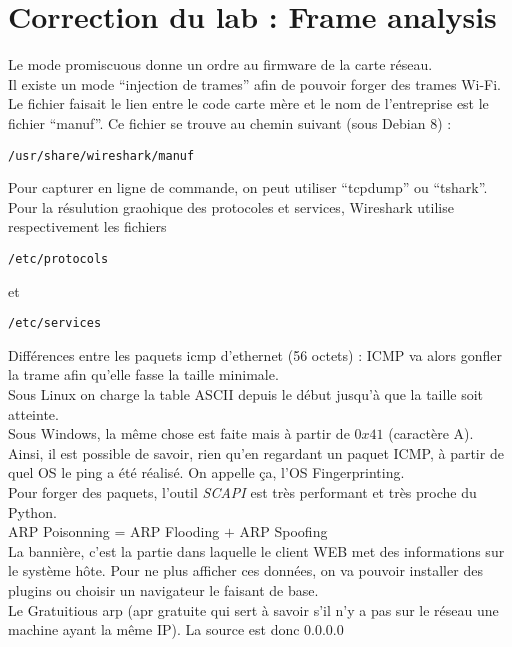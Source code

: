 \section{Correction du lab : Frame analysis}
Le mode promiscuous donne un ordre au firmware de la carte réseau.\\
Il existe un mode \enquote{injection de trames} afin de pouvoir forger des trames Wi-Fi.\\
Le fichier faisait le lien entre le code carte mère et le nom de l'entreprise est le fichier \enquote{manuf}. Ce fichier se trouve au chemin suivant (sous Debian 8) :
\begin{lstlisting}[style=custombash]
 /usr/share/wireshark/manuf
\end{lstlisting}
Pour capturer en ligne de commande, on peut utiliser \enquote{tcpdump} ou \enquote{tshark}.\\
Pour la résulution graohique des protocoles et services, Wireshark utilise respectivement les fichiers 
\begin{lstlisting}[style=custombash]
 /etc/protocols
\end{lstlisting}
et 
\begin{lstlisting}[style=custombash]
 /etc/services
\end{lstlisting}
Différences entre les paquets icmp d'ethernet (56 octets) : ICMP va alors gonfler la trame afin qu'elle fasse la taille minimale.\\
Sous Linux on charge la table ASCII depuis le début jusqu'à que la taille soit atteinte.\\
Sous Windows, la même chose est faite mais à partir de $0x41$ (caractère A).\\
Ainsi, il est possible de savoir, rien qu'en regardant un paquet ICMP, à partir de quel OS le ping a été réalisé. On appelle ça, l'OS Fingerprinting.\\
Pour forger des paquets, l'outil \textit{SCAPI} est très performant et très proche du Python.\\
ARP Poisonning = ARP Flooding $+$ ARP Spoofing\\
La bannière, c'est la partie dans laquelle le client WEB met des informations sur le système hôte. Pour ne plus afficher ces données, on va pouvoir installer des plugins ou choisir un navigateur le faisant de base\cite{KONQ}.\\
Le Gratuitious arp (apr gratuite qui sert à savoir s'il n'y a pas sur le réseau une machine ayant la même IP). La source est donc 0.0.0.0\\
